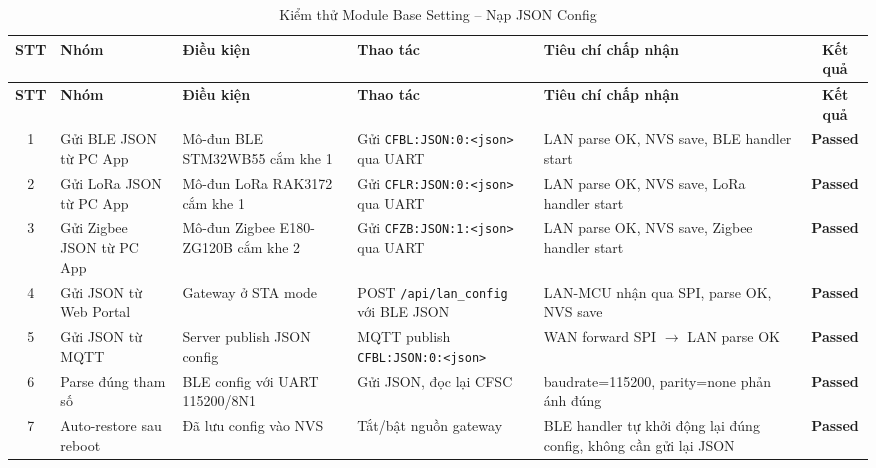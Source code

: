         \begin{longtable}{|c|p{2cm}|p{2.5cm}|p{3.5cm}|p{4cm}|c|}
            \caption{Kiểm thử Module Base Setting -- Nạp JSON Config}
            \label{tab:test_module_base_json} \\
            \hline
            \textbf{STT} & \textbf{Nhóm} & \textbf{Điều kiện} & \textbf{Thao tác} & \textbf{Tiêu chí chấp nhận} & \textbf{Kết quả} \\ \hline
            \endfirsthead
            \hline
            \textbf{STT} & \textbf{Nhóm} & \textbf{Điều kiện} & \textbf{Thao tác} & \textbf{Tiêu chí chấp nhận} & \textbf{Kết quả} \\ \hline
            \endhead
            \hline
            \endfoot
            \endlastfoot
        
            1 & Gửi BLE JSON từ PC App & Mô-đun BLE STM32WB55 cắm khe 1 & Gửi \texttt{CFBL:JSON:0:}\newline\texttt{<json>} qua UART & LAN parse OK, NVS save, BLE handler start & \textcolor{modern_blue}{\textbf{Passed}} \\ \hline
            2 & Gửi LoRa JSON từ PC App & Mô-đun LoRa RAK3172 cắm khe 1 & Gửi \texttt{CFLR:JSON:0:}\newline\texttt{<json>} qua UART & LAN parse OK, NVS save, LoRa handler start & \textcolor{modern_blue}{\textbf{Passed}} \\ \hline
            3 & Gửi Zigbee JSON từ PC App & Mô-đun Zigbee E180-ZG120B cắm khe 2 & Gửi \texttt{CFZB:JSON:1:}\newline\texttt{<json>} qua UART & LAN parse OK, NVS save, Zigbee handler start & \textcolor{modern_blue}{\textbf{Passed}} \\ \hline
            4 & Gửi JSON từ Web Portal & Gateway ở STA mode & POST \texttt{/api/}\newline\texttt{lan\_config} với BLE JSON & LAN-MCU nhận qua SPI, parse OK, NVS save & \textcolor{modern_blue}{\textbf{Passed}} \\ \hline
            5 & Gửi JSON từ MQTT & Server publish JSON config & MQTT publish \texttt{CFBL:JSON:0:}\newline\texttt{<json>} & WAN forward SPI $\rightarrow$ LAN parse OK & \textcolor{modern_blue}{\textbf{Passed}} \\ \hline
            6 & Parse đúng tham số & BLE config với UART 115200/8N1 & Gửi JSON, đọc lại CFSC & baudrate=115200, parity=none phản ánh đúng & \textcolor{modern_blue}{\textbf{Passed}} \\ \hline
            7 & Auto-restore sau reboot & Đã lưu config vào NVS & Tắt/bật nguồn gateway & BLE handler tự khởi động lại đúng config, không cần gửi lại JSON & \textcolor{modern_blue}{\textbf{Passed}} \\ \hline

\end{longtable}
